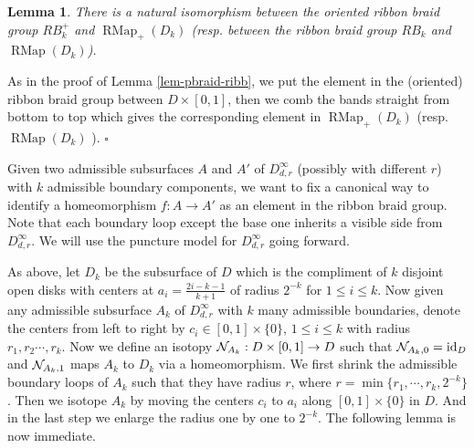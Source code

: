 \documentclass[11pt, a4paper]{amsart}
\newtheorem{lem}[thm]{Lemma}
\theoremstyle{definition}
\newcommand{\id}{{{\rm id}}}
\def\Proof{\noindent{\bf Proof.}\quad}
\def\qed{\hfill$\square$\smallskip}
\DeclareMathOperator{\RMap}{RMap}
\begin{document}
\begin{lem}\label{lem-braid-ribb}
There is a natural isomorphism between the oriented ribbon braid group $RB_k^+$ and $\RMap_+(D_k)$ (resp. between the ribbon braid group $RB_k$ and $\RMap(D_k)$).
\end{lem}
\Proof 
As in the proof of Lemma \ref{lem-pbraid-ribb}, we put the element in the (oriented) ribbon braid group between $D\times [0,1]$, then we comb the bands straight from bottom to top which gives the corresponding element in $\RMap_+(D_k)$ (resp. $\RMap(D_k)$ ).
\qed


Given two admissible subsurfaces $A$ and $A'$  of $D^\infty_{d,r}$ (possibly with different $r$) with $k$ admissible boundary components, we want to fix a canonical way to identify a homeomorphism $f:A\to A'$ as an element in the ribbon braid group. Note that each boundary loop except the base one inherits a visible side from $D^\infty_{d,r}$. We will use the puncture model for  $D^\infty_{d,r}$ going forward.


As above, let $D_k$ be the subsurface of $D$ which is the compliment of $k$ disjoint open disks with centers at $a_i = \frac{2i-k-1}{k+1} $ of radius $2^{-k}$ for $1\leq i\leq k$. Now given any admissible subsurface $A_k$ of $D^\infty_{d,r}$ with $k$ many admissible boundaries, denote the centers from left to right by $c_i \in [0,1]\times \{0\}$, $1\leq i\leq k$ with radius $r_1,r_2\cdots, r_{k}$. Now we define an isotopy ${\mathcal {N}}_{A_k}:D\times [0,1] \to D$ such that $\CN_{A_k,0} =\id_D$ and ${\mathcal {N}}_{A_k,1}$ maps $A_k$ to $D_k$ via a homeomorphism. We first shrink the admissible boundary loops of $A_k$ such that they have radius $r$, where $r = \min \{r_1,\cdots,r_k,2^{-k}\}$. Then we  isotope $A_k$ by moving the centers  $c_i$ to $a_i$ along $ [0,1] \times \{0\}$ in $D$. And in the last step we enlarge the radius one by one to $2^{-k}$. The following lemma is now immediate. 
\end{document}
